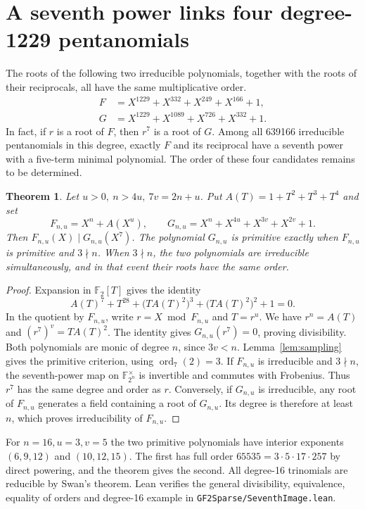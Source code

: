 \documentclass[11pt]{article}
\newtheorem{theorem}{Theorem}
\newcommand{\F}{\mathbb F_2}
\begin{document}
\section{A seventh power links four degree-1229 pentanomials}
\label{sec:seventh-pair}
The roots of the following two irreducible polynomials, together with
the roots of their reciprocals, all have the same multiplicative order.
\[
 \begin{aligned}
 F&=X^{1229}+X^{332}+X^{249}+X^{166}+1,\\
 G&=X^{1229}+X^{1089}+X^{726}+X^{332}+1 .
 \end{aligned}
\]
In fact, if \(r\) is a root of \(F\), then \(r^7\) is a root of \(G\).
Among all 639166 irreducible pentanomials in this degree, exactly
\(F\) and its reciprocal have a seventh power with a five-term minimal
polynomial. The order of these four candidates remains to be determined.

\begin{theorem}\label{thm:seventh-pair}
Let \(u>0,\ n>4u,\ 7v=2n+u\). Put \(A(T)=1+T^2+T^3+T^4\) and set
\[
 F_{n,u}=X^n+A(X^u),\qquad G_{n,u}=X^n+X^{4u}+X^{3v}+X^{2v}+1 .
\]
Then \(F_{n,u}(X)\mid G_{n,u}(X^7)\). The polynomial \(G_{n,u}\)
is primitive exactly when \(F_{n,u}\) is primitive and \(3\nmid n\).
When \(3\nmid n\), the two polynomials are irreducible simultaneously,
and in that event their roots have the same order.
\end{theorem}
\begin{proof}
Expansion in \(\F[T]\) gives the identity
\[
 A(T)^7+T^{28}+\bigl(TA(T)^2\bigr)^3+\bigl(TA(T)^2\bigr)^2+1=0 .
\]
In the quotient by \(F_{n,u}\), write \(r=X\bmod F_{n,u}\) and
\(T=r^u\). We have \(r^n=A(T)\) and \((r^7)^v=T A(T)^2\).
The identity gives \(G_{n,u}(r^7)=0\), proving divisibility.
Both polynomials are monic of degree \(n\), since \(3v<n\).
Lemma~\ref{lem:sampling} gives the primitive criterion, using
\(\operatorname{ord}_7(2)=3\).
If \(F_{n,u}\) is irreducible and \(3\nmid n\), the seventh-power map
on \(\mathbb F_{2^n}^{\times}\) is invertible and commutes with
Frobenius. Thus \(r^7\) has the same degree and order as \(r\).
Conversely, if \(G_{n,u}\) is irreducible, any root of \(F_{n,u}\)
generates a field containing a root of \(G_{n,u}\). Its degree is
therefore at least \(n\), which proves irreducibility of \(F_{n,u}\).
\end{proof}
For \(n=16,u=3,v=5\) the two primitive polynomials have interior
exponents \((6,9,12)\) and \((10,12,15)\). The first has full order
\(65535=3\cdot5\cdot17\cdot257\) by direct powering, and the
theorem gives the second. All degree-16 trinomials are reducible by
Swan's theorem. Lean verifies the general divisibility, equivalence,
equality of orders and degree-16 example in
\nolinkurl{GF2Sparse/SeventhImage.lean}.
\end{document}
